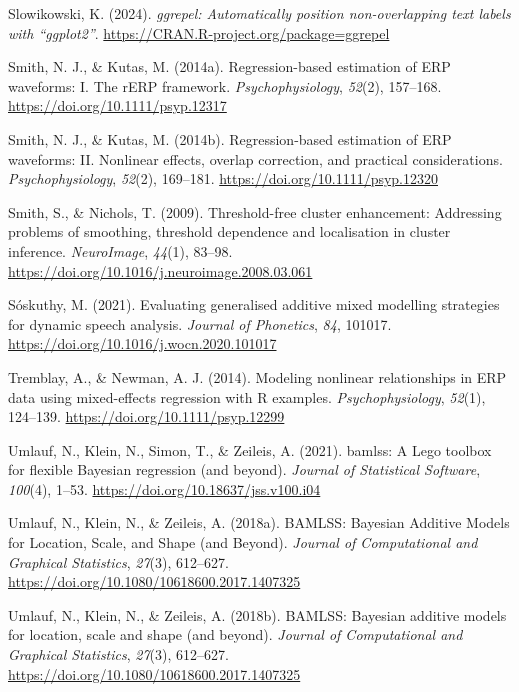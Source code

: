 \documentclass[
  doc,
  floatsintext,
  longtable,
  a4paper,
  nolmodern,
  notxfonts,
  notimes,
  donotrepeattitle,
  colorlinks=true,linkcolor=blue,citecolor=blue,urlcolor=blue]{apa7}
\newlength{\cslhangindent}
\newenvironment{CSLReferences}[2] %
 {\begin{list}{}{%
  \setlength{\itemindent}{0pt}
  \setlength{\leftmargin}{0pt}
  \setlength{\parsep}{0pt}
  \ifodd #1
   \setlength{\leftmargin}{\cslhangindent}
   \setlength{\itemindent}{-1\cslhangindent}
  \fi
  \setlength{\itemsep}{#2\baselineskip}}}
 {\end{list}}
\begin{document}
\begin{CSLReferences}{1}{0}
Slowikowski, K. (2024). \emph{{ggrepel}: Automatically position
non-overlapping text labels with {``{ggplot2}''}}.
\url{https://CRAN.R-project.org/package=ggrepel}

Smith, N. J., \& Kutas, M. (2014a). Regression{-}based estimation of ERP
waveforms: I. The rERP framework. \emph{Psychophysiology}, \emph{52}(2),
157--168. \url{https://doi.org/10.1111/psyp.12317}

Smith, N. J., \& Kutas, M. (2014b). Regression{-}based estimation of ERP
waveforms: II. Nonlinear effects, overlap correction, and practical
considerations. \emph{Psychophysiology}, \emph{52}(2), 169--181.
\url{https://doi.org/10.1111/psyp.12320}

Smith, S., \& Nichols, T. (2009). Threshold-free cluster enhancement:
Addressing problems of smoothing, threshold dependence and localisation
in cluster inference. \emph{NeuroImage}, \emph{44}(1), 83--98.
\url{https://doi.org/10.1016/j.neuroimage.2008.03.061}

Sóskuthy, M. (2021). Evaluating generalised additive mixed modelling
strategies for dynamic speech analysis. \emph{Journal of Phonetics},
\emph{84}, 101017. \url{https://doi.org/10.1016/j.wocn.2020.101017}

Tremblay, A., \& Newman, A. J. (2014). Modeling nonlinear relationships
in ERP data using mixed{-}effects regression with R examples.
\emph{Psychophysiology}, \emph{52}(1), 124--139.
\url{https://doi.org/10.1111/psyp.12299}

Umlauf, N., Klein, N., Simon, T., \& Zeileis, A. (2021). {bamlss}: A
{L}ego toolbox for flexible {B}ayesian regression (and beyond).
\emph{Journal of Statistical Software}, \emph{100}(4), 1--53.
\url{https://doi.org/10.18637/jss.v100.i04}

Umlauf, N., Klein, N., \& Zeileis, A. (2018a). BAMLSS: Bayesian Additive
Models for Location, Scale, and Shape (and Beyond). \emph{Journal of
Computational and Graphical Statistics}, \emph{27}(3), 612--627.
\url{https://doi.org/10.1080/10618600.2017.1407325}

Umlauf, N., Klein, N., \& Zeileis, A. (2018b). {BAMLSS}: {B}ayesian
additive models for location, scale and shape (and beyond).
\emph{Journal of Computational and Graphical Statistics}, \emph{27}(3),
612--627. \url{https://doi.org/10.1080/10618600.2017.1407325}


\end{CSLReferences}
\end{document}

